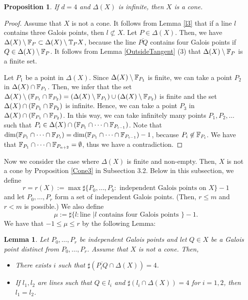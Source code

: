 \documentclass[10pt,oneside]{amsart}
\newtheorem{proposition}{Proposition}
\newtheorem{lemma}{Lemma}
\theoremstyle{definition}
\begin{document}
\begin{proposition} \label{Infinite2} 
If $d=4$ and $\Delta(X)$ is infinite, then $X$ is a cone. 
\end{proposition}

\begin{proof} 
Assume that $X$ is not a cone. 
It follows from Lemma \ref{l3} that if a line $l$ contains three Galois points, then $l \not\subset X$.  
Let $P \in \Delta(X)$.  
Then, we have $\Delta(X) \setminus \Bbb F_P \subset \Delta(X) \setminus \Bbb T_{P}X$, because the line $\overline{PQ}$ contains four Galois points if $Q \in \Delta(X) \setminus \Bbb F_P$. 
It follows from Lemma \ref{OutsideTangent} (3) that $\Delta(X) \setminus \Bbb F_P$ is a finite set. 

Let $P_1$ be a point in $\Delta(X)$. 
Since $\Delta(X) \setminus \Bbb F_{P_1}$ is finite, we can take a point $P_2$ in $\Delta(X) \cap \Bbb F_{P_1}$. 
Then, we infer that the set $\Delta(X) \setminus (\Bbb F_{P_1} \cap \Bbb F_{P_2})=(\Delta(X) \setminus \Bbb F_{P_1}) \cup (\Delta(X) \setminus \Bbb F_{P_2})$ is finite and the set $\Delta(X) \cap (\Bbb F_{P_1} \cap \Bbb F_{P_2} )$ is infinite. 
Hence, we can take a point $P_3$ in $\Delta(X) \cap (\Bbb F_{P_1} \cap \Bbb F_{P_2} )$. 
In this way, we can take infinitely many points $P_1, P_2, \dots$ such that $P_i \in \Delta(X) \cap (\Bbb F_{P_1} \cap \dots \cap \Bbb F_{P_{i-1}})$. 
Note that $\dim(\Bbb F_{P_1} \cap \dots \cap \Bbb F_{P_i}) = \dim(\Bbb F_{P_1} \cap \dots \cap \Bbb F_{P_{i-1}})-1$, because $P_i \not\in \Bbb F_{P_i}$. 
We have that $\Bbb F_{P_1} \cap \dots \cap \Bbb F_{P_{n+2}} = \emptyset$, thus we have a contradiction. 
\end{proof}

Now we consider the case where $\Delta(X)$ is finite and non-empty. 
Then, $X$ is not a cone by Proposition \ref{Cone3} in Subsection 3.2. 
Below in this subsection, 
we define $$r=r(X):=\max\sharp \{P_0, \ldots, P_b: \mbox{ independent Galois points on $X$}\}-1$$ 
and let $P_0, \ldots, P_r$ form a set of independent Galois points. 
(Then, $r \le m$ and $r <m$ is possible.)
We also define 
$$\mu:=\sharp\{l: \mbox{line }| l \mbox{ contains four Galois points } \}-1.$$
We have that $-1 \le \mu \le r$ by the following Lemma:  

\begin{lemma}
Let $P_0, \ldots, P_r$ be independent Galois points and let $Q \in X$ be a Galois point distinct from $P_0, \ldots, P_r$. 
Assume that $X$ is not a cone. 
Then,
\begin{itemize} \label{LinesFourGalois}
\item[(1)] There exists $i$ such that $\sharp (\overline{P_iQ} \cap \Delta(X))=4$.
\item[(2)] If $l_1, l_2$ are lines such that $Q \in l_i$ and $\sharp (l_i \cap \Delta(X))=4$ for $i=1,2$, then $l_1=l_2$.  
\end{itemize} 
\end{lemma}
\end{document}
